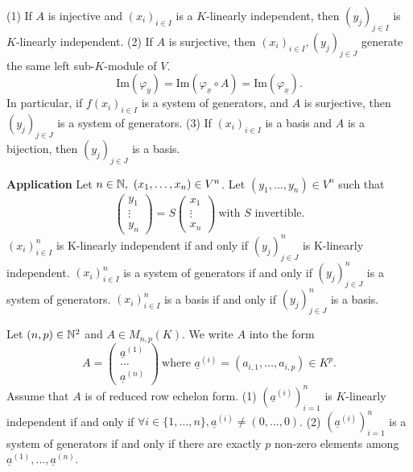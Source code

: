 \begin{propositionenv}
\quad 
\newline
(1) If $A$ is injective and $(x_i)_{i\in I}$ is a $K$-linearly independent, then $(y_j)_{j\in I}$ is  $K$-linearly independent.
\newline
(2) If $A$ is surjective, then $(x_i)_{i\in I},(y_j)_{j\in J}$ generate the same left sub-$K$-module of $V$.
$$\mathrm{Im}(\varphi_y)=\mathrm{Im}(\varphi_{\underline{x}}\circ A)=\mathrm{Im}(\varphi_{\underline{x}}).$$
In particular, if $f(x_i)_{i\in I}$ is a system of generators, and $A$ is surjective, then $(y_j)_{j\in J}$ is a system of generators.
\newline
(3) If $(x_i)_{i\in I}$ is a basis and $A$ is a bijection, then $(y_j)_{j\in J}$ is a basis.
\end{propositionenv}
\begin{box2}
\textbf{Application} \quad Let $n\in \mathbb{N},\ (x_1,\dots,x_n)\in V^n$. Let $(y_1,\dots,y_n)\in V^n$ such that 
$$\begin{pmatrix}
y_1\\
\vdots\\
y_n
\end{pmatrix}=S\begin{pmatrix}
x_1\\
\vdots\\
x_n
\end{pmatrix}\ \text{with } S \text{ invertible.} $$ 
$(x_i)_{i\in I}^n$ is K-linearly independent if and only if $(y_j)_{j\in J}^n$ is K-linearly independent. 
\newline
$(x_i)_{i\in I}^n$ is a system of generators if and only if $(y_j)_{j\in J}^n$ is a system of generators.
\newline
$(x_i)_{i\in I}^n$ is a basis if and only if $(y_j)_{j\in J}^n$ is a basis.  
\end{box2}
\begin{theoremenv}
    Let $(n,p)\in \mathbb{N}^2$ and $A\in M_{n,p}(K)$. We write $A$ into the form 
    $$A=\begin{pmatrix}
    \underline{a}^{(1)}\\
    \dots\\
    \underline{a}^{(n)}
    \end{pmatrix}\ \text{where } \underline{a}^{(i)}=(a_{i,1},\dots,a_{i,p})\in K^p.$$
Assume that $A$ is of reduced row echelon form. 
\newline
(1) $\left(\underline{a}^{(i)}\right)^n_{i=1}$ is $K$-linearly independent if and only if $\forall i\in \{1,\dots,n\},\underline{a}^{(i)}\not=(0,\dots,0)$.
\newline
(2) $\left(\underline{a}^{(i)}\right)^n_{i=1}$ is a system of generators if and only if there are exactly $p$ non-zero elements among $\underline{a}^{(1)},\dots,\underline{a}^{(n)}$.

\end{theoremenv}
